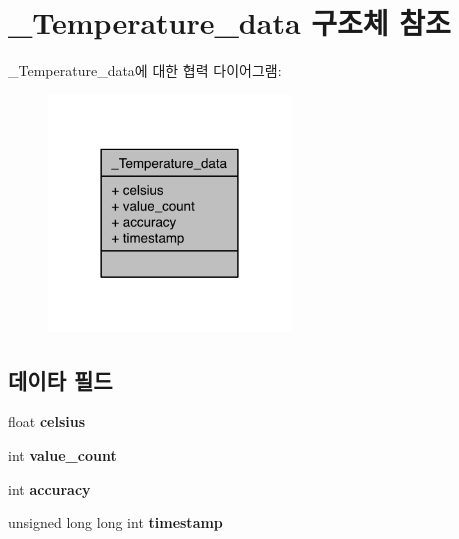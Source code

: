 \hypertarget{struct__Temperature__data}{\section{\-\_\-\-Temperature\-\_\-data 구조체 참조}
\label{struct__Temperature__data}
}


\-\_\-\-Temperature\-\_\-data에 대한 협력 다이어그램\-:\nopagebreak
\begin{figure}[H]
\begin{center}
\leavevmode
\includegraphics[width=182pt]{d0/d4d/struct__Temperature__data__coll__graph}
\end{center}
\end{figure}
\subsection*{데이타 필드}
\begin{DoxyCompactItemize}
\item 
\hypertarget{struct__Temperature__data_aadc6619595463c1d61980fc95cad3f53}{float {\bfseries celsius}}\label{struct__Temperature__data_aadc6619595463c1d61980fc95cad3f53}

\item 
\hypertarget{struct__Temperature__data_a40a079bfc72408819dc78da308203a74}{int {\bfseries value\-\_\-count}}\label{struct__Temperature__data_a40a079bfc72408819dc78da308203a74}

\item 
\hypertarget{struct__Temperature__data_a5565cf9073275f9713f9016e7c10d25f}{int {\bfseries accuracy}}\label{struct__Temperature__data_a5565cf9073275f9713f9016e7c10d25f}

\item 
\hypertarget{struct__Temperature__data_a8de02c4128636a7bf630ff5428f60c8d}{unsigned long long int {\bfseries timestamp}}\label{struct__Temperature__data_a8de02c4128636a7bf630ff5428f60c8d}

\end{DoxyCompactItemize}


